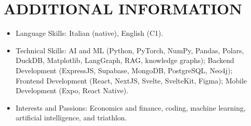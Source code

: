 \documentclass[letterpaper,11pt]{article}
\newlength{\sectionContentSpacing}
\newlength{\interSectionSpacing}
\newcommand{\softbf}[1]{{\fontseries{sb}\selectfont #1}}
\newcommand{\resumeItem}[1]{%
  \item\small{#1}%
}
\newcommand{\resumeItemListStart}{\begin{itemize}[leftmargin=0.16in, labelsep=0.06in, itemsep=0.5pt, topsep=1pt, parsep=0pt, partopsep=0pt]}
\newcommand{\resumeItemListEnd}{\end{itemize}\vspace{-2pt}}
\begin{document}
\vspace{\interSectionSpacing}
\section{ADDITIONAL INFORMATION}
\vspace{\sectionContentSpacing}
    \resumeItemListStart
        \resumeItem{\softbf{Language Skills:} Italian (native), English (C1).}
        \resumeItem{\softbf{Technical Skills:} AI and ML (Python, PyTorch, NumPy, Pandas, Polars, DuckDB, Matplotlib, LangGraph, RAG, knowledge graphs); Backend Development (ExpressJS, Supabase, MongoDB, PostgreSQL, Neo4j); Frontend Development (React, NextJS, Svelte, SvelteKit, Figma); Mobile Development (Expo, React Native).}
        \resumeItem{\softbf{Interests and Passions}: Economics and finance, coding, machine learning, artificial intelligence, and triathlon.}
    \resumeItemListEnd
\end{document}
